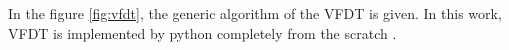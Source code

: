 \documentclass[sigplan]{acmart}\settopmatter{printfolios=true,printccs=false,printacmref=false}
\begin{document}

In the figure \ref{fig:vfdt}, the generic algorithm of the VFDT is given. In this work, VFDT is implemented by python completely from the scratch \cite{ncsufss18}.  
\end{document}
